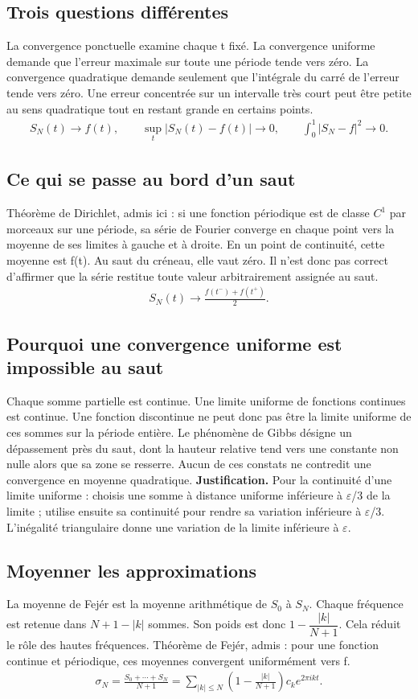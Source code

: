 \documentclass[11pt,a4paper]{article}
\begin{document}
\subsection{Trois questions différentes}
La convergence ponctuelle examine chaque t fixé. La convergence uniforme demande que l’erreur maximale sur toute une période tende vers zéro. La convergence quadratique demande seulement que l’intégrale du carré de l’erreur tende vers zéro. Une erreur concentrée sur un intervalle très court peut être petite au sens quadratique tout en restant grande en certains points.
\[\begin{gathered}S_N(t)\to f(t),\qquad \sup_t|S_N(t)-f(t)|\to0,\qquad \int_0^1|S_N-f|^2\to0.\end{gathered}\]
\subsection{Ce qui se passe au bord d’un saut}
Théorème de Dirichlet, admis ici : si une fonction périodique est de classe $C^1$ par morceaux sur une période, sa série de Fourier converge en chaque point vers la moyenne de ses limites à gauche et à droite. En un point de continuité, cette moyenne est f(t). Au saut du créneau, elle vaut zéro. Il n’est donc pas correct d’affirmer que la série restitue toute valeur arbitrairement assignée au saut.
\[\begin{gathered}S_N(t)\longrightarrow\frac{f(t^-)+f(t^+)}2.\end{gathered}\]
\subsection{Pourquoi une convergence uniforme est impossible au saut}
Chaque somme partielle est continue. Une limite uniforme de fonctions continues est continue. Une fonction discontinue ne peut donc pas être la limite uniforme de ces sommes sur la période entière. Le phénomène de Gibbs désigne un dépassement près du saut, dont la hauteur relative tend vers une constante non nulle alors que sa zone se resserre. Aucun de ces constats ne contredit une convergence en moyenne quadratique.
\textbf{Justification.} Pour la continuité d’une limite uniforme : choisis une somme à distance uniforme inférieure à $\varepsilon$/3 de la limite ; utilise ensuite sa continuité pour rendre sa variation inférieure à $\varepsilon$/3. L’inégalité triangulaire donne une variation de la limite inférieure à $\varepsilon$.
\subsection{Moyenner les approximations}
La moyenne de Fejér est la moyenne arithmétique de $S_0$ à $S_N$. Chaque fréquence est retenue dans $N+1-|k|$ sommes. Son poids est donc $1-\dfrac{|k|}{N+1}$. Cela réduit le rôle des hautes fréquences. Théorème de Fejér, admis : pour une fonction continue et périodique, ces moyennes convergent uniformément vers f.
\[\begin{gathered}\sigma_N=\frac{S_0+\cdots+S_N}{N+1}=\sum_{|k|\le N}\left(1-\frac{|k|}{N+1}\right)c_ke^{2\pi ikt}.\end{gathered}\]
\end{document}
